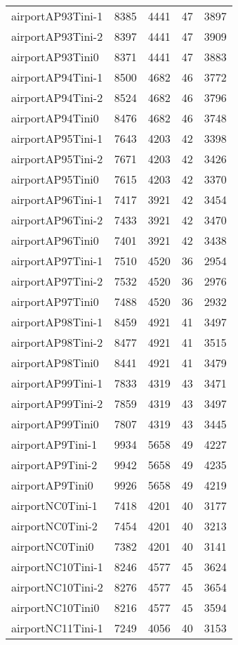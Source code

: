 \documentclass[../../../thesis.tex]{subfiles}
\begin{document}
\begin{longtable}{lrrrr}
airportAP93Tini-1 & 8385 & 4441 & 47 & 3897 \\
airportAP93Tini-2 & 8397 & 4441 & 47 & 3909 \\
airportAP93Tini0 & 8371 & 4441 & 47 & 3883 \\
airportAP94Tini-1 & 8500 & 4682 & 46 & 3772 \\
airportAP94Tini-2 & 8524 & 4682 & 46 & 3796 \\
airportAP94Tini0 & 8476 & 4682 & 46 & 3748 \\
airportAP95Tini-1 & 7643 & 4203 & 42 & 3398 \\
airportAP95Tini-2 & 7671 & 4203 & 42 & 3426 \\
airportAP95Tini0 & 7615 & 4203 & 42 & 3370 \\
airportAP96Tini-1 & 7417 & 3921 & 42 & 3454 \\
airportAP96Tini-2 & 7433 & 3921 & 42 & 3470 \\
airportAP96Tini0 & 7401 & 3921 & 42 & 3438 \\
airportAP97Tini-1 & 7510 & 4520 & 36 & 2954 \\
airportAP97Tini-2 & 7532 & 4520 & 36 & 2976 \\
airportAP97Tini0 & 7488 & 4520 & 36 & 2932 \\
airportAP98Tini-1 & 8459 & 4921 & 41 & 3497 \\
airportAP98Tini-2 & 8477 & 4921 & 41 & 3515 \\
airportAP98Tini0 & 8441 & 4921 & 41 & 3479 \\
airportAP99Tini-1 & 7833 & 4319 & 43 & 3471 \\
airportAP99Tini-2 & 7859 & 4319 & 43 & 3497 \\
airportAP99Tini0 & 7807 & 4319 & 43 & 3445 \\
airportAP9Tini-1 & 9934 & 5658 & 49 & 4227 \\
airportAP9Tini-2 & 9942 & 5658 & 49 & 4235 \\
airportAP9Tini0 & 9926 & 5658 & 49 & 4219 \\
airportNC0Tini-1 & 7418 & 4201 & 40 & 3177 \\
airportNC0Tini-2 & 7454 & 4201 & 40 & 3213 \\
airportNC0Tini0 & 7382 & 4201 & 40 & 3141 \\
airportNC10Tini-1 & 8246 & 4577 & 45 & 3624 \\
airportNC10Tini-2 & 8276 & 4577 & 45 & 3654 \\
airportNC10Tini0 & 8216 & 4577 & 45 & 3594 \\
airportNC11Tini-1 & 7249 & 4056 & 40 & 3153 \\

\end{longtable}
\end{document}
